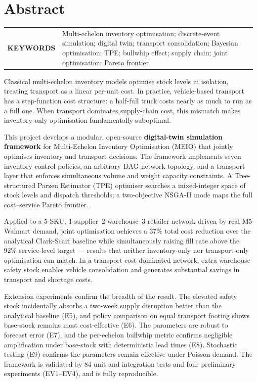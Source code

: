 \chapter{Abstract}
\begin{onehalfspacing}
\begin{tabular}{@{} >{\bfseries}p{} p{} @{}}
\MakeUppercase{Keywords} &
Multi-echelon inventory optimisation; discrete-event simulation; digital twin;
transport consolidation; Bayesian optimisation; TPE; bullwhip effect; supply
chain; joint optimisation; Pareto frontier\\
\end{tabular}
\par
Classical multi-echelon inventory models optimise stock levels in isolation,
treating transport as a linear per-unit cost.  In practice, vehicle-based
transport has a step-function cost structure: a half-full truck costs nearly
as much to run as a full one.  When transport dominates supply-chain cost,
this mismatch makes inventory-only optimisation fundamentally suboptimal.

This project develops a modular, open-source \textbf{digital-twin simulation
framework} for Multi-Echelon Inventory Optimisation (MEIO) that jointly
optimises inventory and transport decisions.  The framework implements seven
inventory control policies, an arbitrary DAG network topology, and a transport
layer that enforces simultaneous volume and weight capacity constraints.  A
Tree-structured Parzen Estimator (TPE) optimiser searches a mixed-integer
space of stock levels and dispatch thresholds; a two-objective NSGA-II mode
maps the full cost--service Pareto frontier.

Applied to a 5-SKU, 1-supplier--2-warehouse--3-retailer network driven by
real M5 Walmart demand, joint optimisation achieves a 37\% total cost
reduction over the analytical Clark-Scarf baseline while simultaneously
raising fill rate above the 92\% service-level target --- results that
neither inventory-only nor transport-only optimisation can match.  In a
transport-cost-dominated network, extra warehouse safety stock enables
vehicle consolidation and generates substantial savings in transport
and shortage costs.

Extension experiments confirm the breadth of the result.  The elevated safety
stock incidentally absorbs a two-week supply disruption better than the
analytical baseline (E5), and policy comparison on equal transport footing
shows base-stock remains most cost-effective (E6).  The parameters are robust
to forecast error (E7), and the per-echelon bullwhip metric confirms
negligible amplification under base-stock with deterministic lead times (E8).
Stochastic testing (E9) confirms the parameters remain effective under
Poisson demand.  The framework is validated by 84 unit and integration tests
and four preliminary experiments (EV1--EV4), and is fully reproducible.
\par\end{onehalfspacing}

